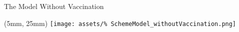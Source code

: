 \begin{frame}{The Model Without Vaccination}
        \setlength{\leftmargini}{1mm}
    \begin{textblock*}{65mm}(5mm, 25mm)
            \texttt{[image: assets/\%
                SchemeModel\_withoutVaccination.png]}
    \end{textblock*}
\end{frame}